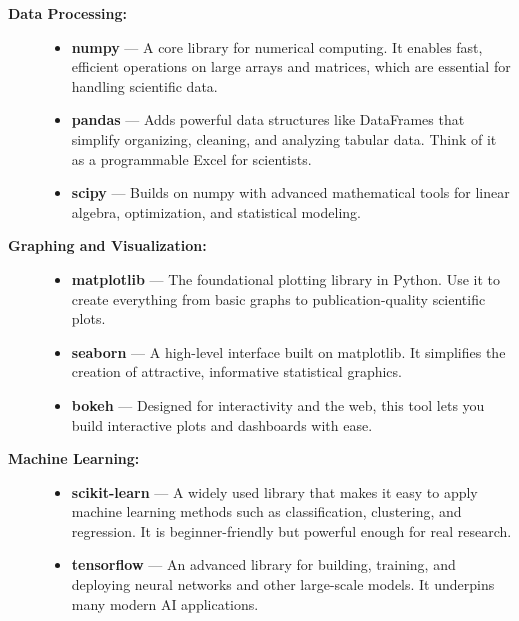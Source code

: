 \begin{description}
    \item[\textbf{Data Processing:}] \mbox{}    
    \begin{itemize}
        \item \textbf{numpy} — A core library for numerical computing. It enables fast, efficient operations on large arrays and matrices, which are essential for handling scientific data.
        \item \textbf{pandas} — Adds powerful data structures like DataFrames that simplify organizing, cleaning, and analyzing tabular data. Think of it as a programmable Excel for scientists.
        \item \textbf{scipy} — Builds on numpy with advanced mathematical tools for linear algebra, optimization, and statistical modeling.
    \end{itemize}

    \item[\textbf{Graphing and Visualization:}]  \mbox{}   
    \begin{itemize}
        \item \textbf{matplotlib} — The foundational plotting library in Python. Use it to create everything from basic graphs to publication-quality scientific plots.
        \item \textbf{seaborn} — A high-level interface built on matplotlib. It simplifies the creation of attractive, informative statistical graphics.
        \item \textbf{bokeh} — Designed for interactivity and the web, this tool lets you build interactive plots and dashboards with ease.
    \end{itemize}

\item[\textbf{Machine Learning:}] \mbox{}   
\begin{itemize}
    \item \textbf{scikit-learn} — A widely used library that makes it easy to apply machine learning methods such as classification, clustering, and regression. It is beginner-friendly but powerful enough for real research.
    \item \textbf{tensorflow} — An advanced library for building, training, and deploying neural networks and other large-scale models. It underpins many modern AI applications.
\end{itemize}



\end{description}
